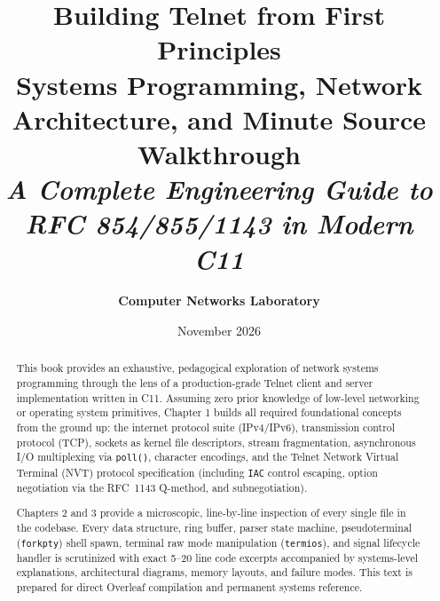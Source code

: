 \documentclass[11pt,a4paper]{report}
\title{
    \vspace{-1.5cm}
    {\huge\textbf{Building Telnet from First Principles}}\\[0.4cm]
    {\Large\textbf{Systems Programming, Network Architecture, and Minute Source Walkthrough}}\\[0.2cm]
    {\normalsize\textsl{A Complete Engineering Guide to RFC 854/855/1143 in Modern C11}}
}
\author{\textbf{Computer Networks Laboratory}}
\date{November 2026}
\begin{document}
\maketitle

\begin{abstract}
\noindent This book provides an exhaustive, pedagogical exploration of network systems programming through the lens of a production-grade Telnet client and server implementation written in C11. Assuming zero prior knowledge of low-level networking or operating system primitives, Chapter 1 builds all required foundational concepts from the ground up: the internet protocol suite (IPv4/IPv6), transmission control protocol (TCP), sockets as kernel file descriptors, stream fragmentation, asynchronous I/O multiplexing via \texttt{poll()}, character encodings, and the Telnet Network Virtual Terminal (NVT) protocol specification (including \texttt{IAC} control escaping, option negotiation via the RFC~1143 Q-method, and subnegotiation). 

Chapters 2 and 3 provide a microscopic, line-by-line inspection of every single file in the codebase. Every data structure, ring buffer, parser state machine, pseudoterminal (\texttt{forkpty}) shell spawn, terminal raw mode manipulation (\texttt{termios}), and signal lifecycle handler is scrutinized with exact 5--20 line code excerpts accompanied by systems-level explanations, architectural diagrams, memory layouts, and failure modes. This text is prepared for direct Overleaf compilation and permanent systems reference.
\end{abstract}

\tableofcontents
\newpage


\newpage

\newpage

\end{document}
